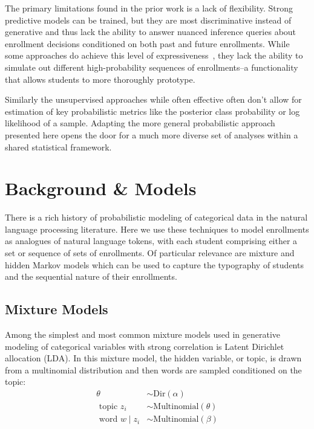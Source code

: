 \documentclass{edm_template}
\begin{document}
The primary limitations found in the prior work is a lack of flexibility. Strong predictive models can be trained, but they are most discriminative instead of generative and thus lack the ability to answer nuanced inference queries about enrollment decisions conditioned on both past and future enrollments. While some approaches do achieve this level of expressiveness~\cite{Jiang2018GoalbasedCR}, they lack the ability to simulate out different high-probability sequences of enrollments--a functionality that allows students to more thoroughly prototype. 

Similarly the unsupervised approaches while often effective often don't allow for estimation of key probabilistic metrics like the posterior class probability or log likelihood of a sample. Adapting the more general probabilistic approach presented here opens the door for a much more diverse set of analyses within a shared statistical framework.

\section{Background \& Models}

There is a rich history of probabilistic modeling of categorical data in the natural language processing literature. Here we use these techniques to model enrollments as analogues of natural language tokens, with each student comprising either a set or sequence of sets of enrollments. Of particular relevance are mixture and hidden Markov models which can be used to capture the typography of students and the sequential nature of their enrollments. 

\subsection{Mixture Models}

Among the simplest and most common mixture models used in generative modeling of categorical variables with strong correlation is Latent Dirichlet allocation (LDA). In this mixture model, the hidden variable, or topic, is drawn from a multinomial distribution and then words are sampled conditioned on the topic:
\begin{align*}
\theta &\sim \text{Dir}(\alpha) \\
\text{ topic } z_i &\sim \text{Multinomial}(\theta) \\
\text{ word } w \mid z_i &\sim \text{Multinomial}(\beta) \\ 	
\end{align*}
\end{document}
